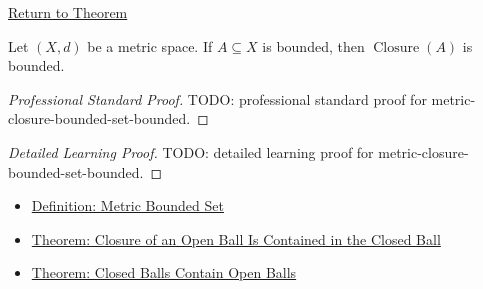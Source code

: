 \newpage
{}
\label{prf:metric-closure-bounded-set-bounded}

\begin{remark*}[Return]
\hyperref[thm:metric-closure-bounded-set-bounded]{Return to Theorem}
\end{remark*}

\begin{theorem*}
Let \((X,d)\) be a metric space.  If \(A\subseteq X\) is bounded, then
\(\operatorname{Closure}(A)\) is bounded.
\end{theorem*}

\begin{proof}[Professional Standard Proof]
\LRAProofBodyStart
TODO: professional standard proof for metric-closure-bounded-set-bounded.
\end{proof}

\begin{proof}[Detailed Learning Proof]
\LRAProofBodyStart
TODO: detailed learning proof for metric-closure-bounded-set-bounded.
\end{proof}

\begin{remark*}
\end{remark*}

\begin{dependencies}
\begin{itemize}
  \item \hyperref[def:metric-bounded-set]{Definition: Metric Bounded Set}
  \item \hyperref[thm:metric-closure-open-ball-contained-closed-ball]{Theorem: Closure of an Open Ball Is Contained in the Closed Ball}
  \item \hyperref[thm:metric-closed-balls-contain-open-balls]{Theorem: Closed Balls Contain Open Balls}
\end{itemize}
\end{dependencies}

\clearpage
